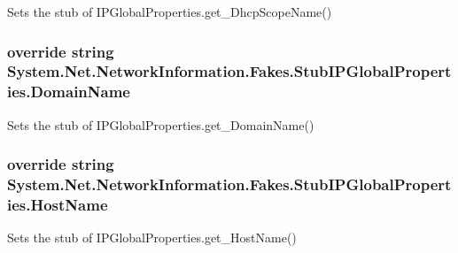Sets the stub of I\-P\-Global\-Properties.\-get\-\_\-\-Dhcp\-Scope\-Name()

\hypertarget{class_system_1_1_net_1_1_network_information_1_1_fakes_1_1_stub_i_p_global_properties_a677c65632efc4aba4dc06de974edf5a0}{
\subsubsection[{Domain\-Name}]{\setlength{\rightskip}{0pt plus 5cm}override string System.\-Net.\-Network\-Information.\-Fakes.\-Stub\-I\-P\-Global\-Properties.\-Domain\-Name\hspace{0.3cm}{\ttfamily [get]}}}\label{class_system_1_1_net_1_1_network_information_1_1_fakes_1_1_stub_i_p_global_properties_a677c65632efc4aba4dc06de974edf5a0}


Sets the stub of I\-P\-Global\-Properties.\-get\-\_\-\-Domain\-Name()

\hypertarget{class_system_1_1_net_1_1_network_information_1_1_fakes_1_1_stub_i_p_global_properties_acc7bb486bcbe917e54f187212ac40d24}{
\subsubsection[{Host\-Name}]{\setlength{\rightskip}{0pt plus 5cm}override string System.\-Net.\-Network\-Information.\-Fakes.\-Stub\-I\-P\-Global\-Properties.\-Host\-Name\hspace{0.3cm}{\ttfamily [get]}}}\label{class_system_1_1_net_1_1_network_information_1_1_fakes_1_1_stub_i_p_global_properties_acc7bb486bcbe917e54f187212ac40d24}


Sets the stub of I\-P\-Global\-Properties.\-get\-\_\-\-Host\-Name()

